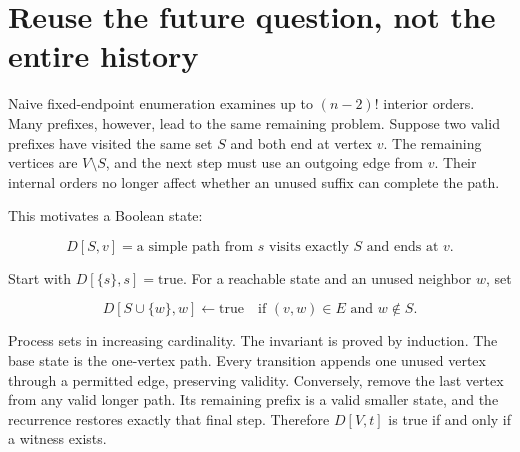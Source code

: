 
\section{Reuse the future question, not the entire
history}\label{reuse-the-future-question-not-the-entire-history}

Naive fixed-endpoint enumeration examines up to \((n-2)!\) interior
orders. Many prefixes, however, lead to the same remaining problem.
Suppose two valid prefixes have visited the same set \(S\) and both end
at vertex \(v\). The remaining vertices are \(V\setminus S\), and the
next step must use an outgoing edge from \(v\). Their internal orders no
longer affect whether an unused suffix can complete the path.

This motivates a Boolean state:

\begin{equation}
D[S,v]=\text{a simple path from }s\text{ visits exactly }S\text{ and ends at }v.
\end{equation}


Start with \(D[\{s\},s]=\mathrm{true}\). For a reachable state and an
unused neighbor \(w\), set

\begin{equation}
D[S\cup\{w\},w]\leftarrow\mathrm{true}
\quad\text{if }(v,w)\in E\text{ and }w\notin S.
\end{equation}

Process sets in increasing cardinality. The invariant is proved by
induction. The base state is the one-vertex path. Every transition
appends one unused vertex through a permitted edge, preserving validity.
Conversely, remove the last vertex from any valid longer path. Its
remaining prefix is a valid smaller state, and the recurrence restores
exactly that final step. Therefore \(D[V,t]\) is true if and only if a
witness exists.

